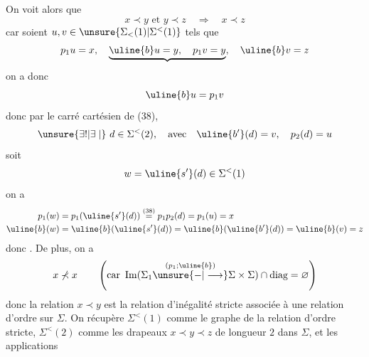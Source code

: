 On voit alors que
\[
x\prec y\text{ et }y\prec z\quad\Longrightarrow\quad x\prec z
\]
car soient $u,v\in\unsure{\Sigma_{<}(1)|\Sigma^{<}(1)}$ tels que
\[
p_1u=x,\quad\underbrace{\uline{b}u=y,\quad p_1v=y},\quad\uline{b}v=z
\]
on a donc
\[
\uline{b}u=p_1v
\]
donc par le carré cartésien de (38), 
\[
\unsure{\exists!|\exists\mid}\ d\in\Sigma^{<}(2),\quad\text{avec}\quad\uline{b'}(d)=v,\quad p_2(d)=u
\]
soit
\[
w=\uline{s'}(d)\in\Sigma^{<}(1)
\]
on a
\[
\begin{aligned}
p_1(w)&=p_1(\uline{s'}(d))\overset{(38)}{=}p_1p_2(d)=p_1(u)=x\\
\uline{b}(w)&=\uline{b}(\uline{s'}(d))=\uline{b}(\uline{b'}(d))=\uline{b}(v)=z
\end{aligned}
\]
donc
.
De plus, on a
\[
x\not\prec x\qquad\left(\text{car }\operatorname{Im}(\Sigma_1\overset{(p_1;\uline{b})}{\unsure{-|\longrightarrow}}\Sigma\times\Sigma)\cap\text{diag}=\varnothing\right)
\]
donc la relation $x\prec y$ est la relation
d'inégalité stricte associée à une relation
d'ordre sur $\Sigma$. On récupère $\Sigma^{<}(1)$ comme
le graphe de la relation d'ordre stricte,
$\Sigma^{<}(2)$ comme les drapeaux $x\prec y\prec z$ de
longueur $2$ dans $\Sigma$, et les applications
